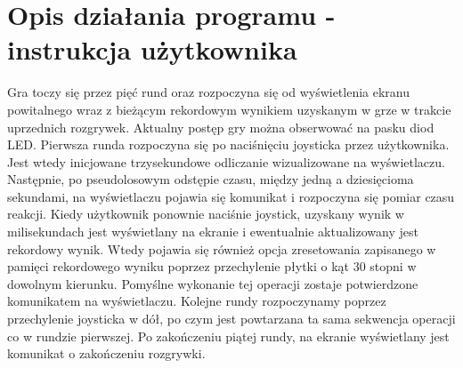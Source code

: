 \documentclass[a4paper,12pt]{report}
\begin{document}
\chapter{Opis działania programu - instrukcja użytkownika}
Gra toczy się przez pięć rund oraz rozpoczyna się od wyświetlenia ekranu powitalnego wraz z bieżącym rekordowym wynikiem uzyskanym w grze w trakcie uprzednich rozgrywek. Aktualny postęp gry można obserwować na pasku diod LED. Pierwsza runda rozpoczyna się po naciśnięciu joysticka przez użytkownika. Jest wtedy inicjowane trzysekundowe odliczanie wizualizowane na wyświetlaczu. Następnie, po pseudolosowym odstępie czasu, między jedną a dziesięcioma sekundami, na wyświetlaczu pojawia się komunikat i rozpoczyna się pomiar czasu reakcji. Kiedy użytkownik ponownie naciśnie joystick, uzyskany wynik w milisekundach jest wyświetlany na ekranie i ewentualnie aktualizowany jest rekordowy wynik. Wtedy pojawia się również opcja zresetowania zapisanego w pamięci rekordowego wyniku poprzez przechylenie płytki o kąt 30 stopni w dowolnym kierunku. Pomyślne wykonanie tej operacji zostaje potwierdzone komunikatem na wyświetlaczu. Kolejne rundy rozpoczynamy poprzez przechylenie joysticka w dół, po czym jest powtarzana ta sama sekwencja operacji co w rundzie pierwszej. Po zakończeniu piątej rundy, na ekranie wyświetlany jest komunikat o zakończeniu rozgrywki.
\end{document}
